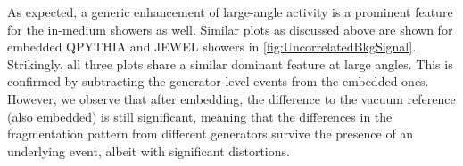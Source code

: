 As expected, a generic enhancement of large-angle activity is a prominent feature for the in-medium showers as well.
Similar plots as discussed above are shown for embedded QPYTHIA and JEWEL showers in \autoref{fig:UncorrelatedBkgSignal}. 
Strikingly, all three plots share a similar dominant feature at large angles. This is confirmed by subtracting the generator-level events from the embedded ones. However, we observe that after embedding, the difference to the vacuum reference (also embedded) is still significant, meaning that the differences in the fragmentation pattern from different generators survive the presence of an underlying event, albeit with significant distortions.
